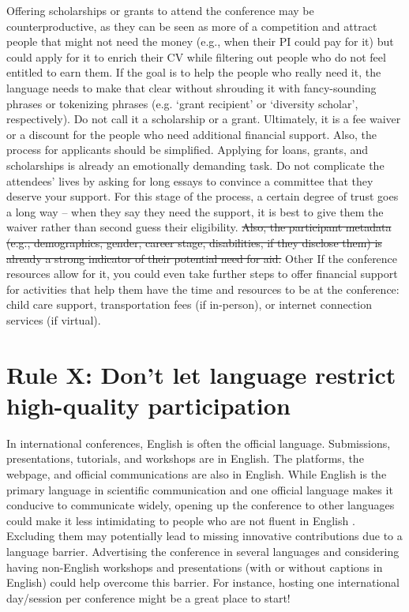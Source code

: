 \documentclass[10pt,letterpaper]{article}
\begin{document}
Offering scholarships or grants to attend the conference may be counterproductive, as they can be seen as more of a competition and attract people that might not need the money (e.g., when their PI could pay for it) but could apply for it to enrich their CV while filtering out people who do not feel entitled to earn them. If the goal is to help the people who really need it, the language needs to make that clear without shrouding it with fancy-sounding phrases or tokenizing phrases (e.g. `grant recipient' or `diversity scholar', respectively). Do not call it a scholarship or a grant. Ultimately, it is a fee waiver or a discount for the people who need additional financial support. Also, the process for applicants should be simplified. Applying for loans, grants, and scholarships is already an emotionally demanding task. Do not complicate the attendees' lives by asking for long essays to convince a committee that they deserve your support. For this stage of the process, a certain degree of trust goes a long way -- when they say they need the support, it is best to give them the waiver rather than second guess their eligibility. \st{Also, the participant metadata (e.g., demographics, gender, career stage, disabilities, if they disclose them) is already a strong indicator of their potential need for aid.} Other If the conference resources allow for it, you could even take further steps to offer financial support for activities that help them have the time and resources to be at the conference: child care support, transportation fees (if in-person), or internet connection services (if virtual). 

\section{Rule X: Don't let language restrict high-quality participation}
\label{rule_language}

In international conferences, English is often the official language. Submissions, presentations, tutorials, and workshops are in English. The platforms, the webpage, and official communications are also in English. While English is the primary language in scientific communication and one official language makes it conducive to communicate widely, opening up the conference to other languages could make it less intimidating to people who are not fluent in English \cite{niner_better_2021}. Excluding them may potentially lead to missing innovative contributions due to a language barrier. Advertising the conference in several languages and considering having non-English workshops and presentations (with or without captions in English) could help overcome this barrier. For instance, hosting one international day/session per conference might be a great place to start!
\end{document}
